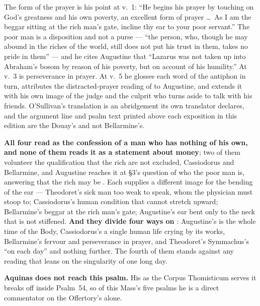 \begin{witnessnote}
The form of the prayer is his point at v.~1: ``He begins his prayer by touching
on God's greatness and his own poverty, an excellent form of prayer \dots\ As I
am the beggar sitting at the rich man's gate, incline thy ear to your poor
servant.'' The poor man is a disposition and not a purse --- ``the person, who,
though he may abound in the riches of the world, still does not put his trust in
them, takes no pride in them'' --- and he cites Augustine that ``Lazarus was not
taken up into Abraham's bosom by reason of his poverty, but on account of his
humility.'' At v.~3  is perseverance in prayer. At v.~5 he
glosses each word of the antiphon in turn, attributes the distracted-prayer
reading of  to Augustine, and extends it with his own image of the
judge and the culprit who turns aside to talk with his friends. O'Sullivan's
translation is an abridgement its own translator declares, and the argument line
and psalm text printed above each exposition in this edition are the Douay's and
not Bellarmine's.
\end{witnessnote}

\textbf{All four read  as the confession of a man who has
nothing of his own, and none of them reads it as a statement about money}; two
of them volunteer the qualification that the rich are not excluded, Cassiodorus
and Bellarmine, and Augustine reaches it at \S3's question of who the poor man
is, answering that the rich may be . Each supplies a different image for the bending of the
ear --- Theodoret's sick man too weak to speak, whom
the physician must stoop to; Cassiodorus's human condition that cannot stretch
upward; Bellarmine's beggar at the rich man's gate; Augustine's ear bent only to
the neck that is not stiffened. \textbf{And they divide four ways on }: Augustine's is the whole time of the Body, Cassiodorus's a single human
life crying by its works, Bellarmine's fervour and perseverance in prayer, and
Theodoret's Symmachus's ``on each day'' and nothing further. The fourth of them
stands against any reading that leans on the singularity of one long day.

\textbf{Aquinas does not reach this psalm.} His  as the Corpus Thomisticum serves it breaks off inside Psalm~54, so of
this Mass's five psalms he is a direct commentator on the Offertory's alone.

